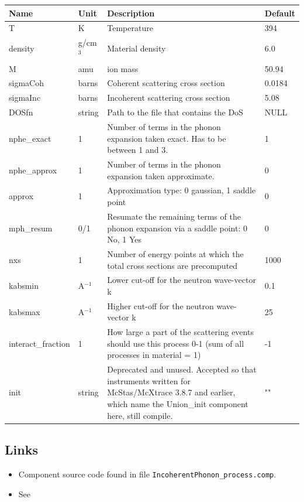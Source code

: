 \begin{longtable}{p{}p{}p{}p{}}
\toprule
\textbf{Name} & \textbf{Unit} & \textbf{Description} & \textbf{Default} \\
\midrule
\endhead
T & K & Temperature & 394 \\
density & g/cm$^{3}$ & Material density & 6.0 \\
M & amu & ion mass & 50.94 \\
sigmaCoh & barns & Coherent scattering cross section & 0.0184 \\
sigmaInc & barns & Incoherent scattering cross section & 5.08 \\
DOSfn & string & Path to the file that contains the DoS & NULL \\
nphe\_exact & 1 & Number of terms in the phonon expansion taken exact. Has to be between 1 and 3. & 1 \\
nphe\_approx & 1 & Number of terms in the phonon expansion taken approximate. & 0 \\
approx & 1 & Approximation type: 0 gaussian, 1 saddle point & 0 \\
mph\_resum & 0/1 & Resumate the remaining terms of the phonon expansion via a saddle point: 0 No, 1 Yes & 0 \\
nxs & 1 & Number of energy points at which the total cross sections are precomputed & 1000 \\
kabsmin & A$^{-1}$ & Lower cut-off for the neutron wave-vector k & 0.1 \\
kabsmax & A$^{-1}$ & Higher cut-off for the neutron wave-vector k & 25 \\
interact\_fraction & 1 & How large a part of the scattering events should use this process 0-1 (sum of all processes in material = 1) & -1 \\
init & string & Deprecated and unused. Accepted so that instruments written for McStas/McXtrace 3.8.7 and earlier, which name the Union\_init component here, still compile. & "" \\
\bottomrule
\end{longtable}

\subsection*{Links}
\begin{itemize}
  \item Component source code found in file \texttt{IncoherentPhonon\_process.comp}.
  \item See 
\end{itemize}
